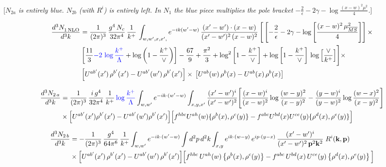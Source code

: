 \documentclass[9pt]{article}
\numberwithin{equation}{section}
\newcommand{\rnote}[1]{{\color{teal}[\textit{#1}]}}
\begin{document}
\rnote{$N_{2a}$ is entirely blue. $N_{2b}$ (with $R^{i}$) is entirely left. In $N_{1}$ the blue piece multiplies the pole bracket $-\frac{2}{\epsilon}-2\gamma-\log\frac{(x-w)^{2}\mu^{2}}{4}$.}

\begin{align}
     \frac{d^{3}N_{1\,\rm NLO}^{\rm}}{d^{3}k} &  = \frac{1}{(2\pi)^{3}}\, \frac{g^{4}\,N_{c}}{32\pi^{4}}\,\frac{1}{k^{+}}\, \int_{w, w',x,x',} e^{-ik(w^\prime-w)}\, \frac{(x'-w')\cdot (x-w)}{(x'-w')^{2}\, (x-w)^{2}}\, \Bigg[\left[-\frac{2}{\epsilon}-2\gamma-\log{\left[\frac{(x-w)^{2}\,\mu^{2}_{\overline{MS}}}{4}\right]}\right]\times \notag \\ & \left[\frac{11}{3}{\color{blue}-2\,\log\frac{k^{+}}{\Lambda}}+\log{\left(1-\frac{k^{+}}{\vee}\right)}\right]-\frac{67}{9}+\frac{\pi^{2}}{3}+\log^{2}{\left[1-\frac{k^{+}}{\vee}\right]}+\log{\left[1-\frac{k^{+}}{\vee}\right]}\,\log{\left[\frac{\vee}{k^{+}}\right]}\Bigg]\times\notag \\ & \left[U^{ab'}(x')\,\rho^{b'}(x') - U^{ab'}(w')\,\rho^{b'}(x')\right]\times\,\left[U^{ab}(w)\,\rho^{b}(x) - U^{ab}(x)\,\rho^{b}(x)\right]
\end{align}

\begin{align}
\frac{d^{3}N_{2\,a}}{d^{3}k} & = \frac{1}{(2\pi)^{3}}\,\frac{i\,g^{4}}{32\pi^{4}}\,\frac{1}{k^{+}}\,{\color{blue}\log\frac{k^{+}}{\Lambda}}\int_{w,w'} e^{-ik\cdot(w'-w)}\int_{x,y,x'}\frac{(x'-w')^{i}}{(x'-w')^{2}}\Bigg[\frac{(x-w)^{i}}{(x-w)^{2}}\log\frac{(w-y)^{2}}{(x-y)^{2}}-\frac{(y-w)^{i}}{(y-w)^{2}}\log\frac{(w-x)^{2}}{(x-y)^{2}}\Bigg]\notag\\
&\times\Big[U^{ab'}(x')\rho^{b'}(x')-U^{ab'}(w')\rho^{b'}(x')\Big]\Big[f^{hbc}U^{ah}(w)\{\rho^{b}(x),\rho^{c}(y)\}-f^{abc}U^{bd}(x)U^{ce}(y)\{\rho^{d}(x),\rho^{e}(y)\}\Big]
\end{align}

\begin{align}
\frac{d^{3}N_{2\,b}}{d^{3}k} & = -\frac{1}{(2\pi)^{3}}\,\frac{g^{4}}{64\pi^{6}}\,\frac{1}{k^{+}}\int_{w,w'} e^{-ik\cdot(w'-w)}
\int d^{2}p\,d^{2}k\int_{x,y} e^{ik\cdot(w-y)}\,e^{ip\cdot(y-x)}\,\frac{(x'-w')^{i}}{(x'-w')^{2}\,\mathbf{p}^{2}\mathbf{k}^{2}}\;R^{i}(\mathbf{k},\mathbf{p})\notag\\
&\times\Big[U^{ab'}(x')\,\rho^{b'}(x')-U^{ab'}(w')\,\rho^{b'}(x')\Big]
\Big[f^{hbc}\,U^{ah}(w)\left\{\rho^{b}(x),\rho^{c}(y)\right\}-f^{abc}\,U^{bd}(x)\,U^{ce}(y)\left\{\rho^{d}(x),\rho^{e}(y)\right\}\Big]
\end{align}
\end{document}
